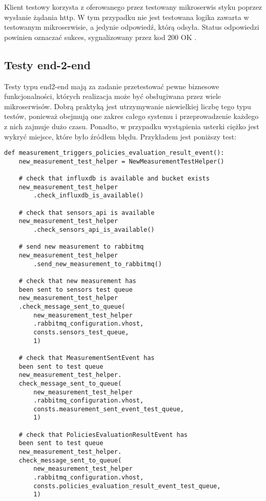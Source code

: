 Klient testowy korzysta z oferowanego przez testowany mikroserwis styku poprzez 
wysłanie żądania http. W tym przypadku nie jest testowana logika zawarta w testowanym 
mikroserwisie, a jedynie odpowiedź, którą odsyła. Status odpowiedzi powinien oznaczać 
sukces, sygnalizowany przez kod 200 OK \cite{fielding1999}.

\subsection{Testy end-2-end}

Testy typu end2-end mają za zadanie przetestować pewne biznesowe 
funkcjonalności, których realizacja może być obsługiwana przez wiele mikroserwisów. 
Dobrą praktyką jest utrzymywanie niewielkiej liczbę tego typu testów, ponieważ 
obejmują one zakres całego systemu i przeprowadzenie każdego z nich zajmuje dużo 
czasu. Ponadto, w przypadku wystąpienia usterki ciężko jest wykryć miejsce, które 
było źródłem błędu.
Przykładem jest poniższy test:

\begin{lstlisting}
def measurement_triggers_policies_evaluation_result_event():
    new_measurement_test_helper = NewMeasurementTestHelper()

    # check that influxdb is available and bucket exists
    new_measurement_test_helper
        .check_influxdb_is_available()

    # check that sensors_api is available
    new_measurement_test_helper
        .check_sensors_api_is_available()

    # send new measurement to rabbitmq
    new_measurement_test_helper
        .send_new_measurement_to_rabbitmq()

    # check that new measurement has 
    been sent to sensors test queue
    new_measurement_test_helper
    .check_message_sent_to_queue(
        new_measurement_test_helper
        .rabbitmq_configuration.vhost,
        consts.sensors_test_queue, 
        1)

    # check that MeasurementSentEvent has 
    been sent to test queue  
    new_measurement_test_helper.
    check_message_sent_to_queue(
        new_measurement_test_helper
        .rabbitmq_configuration.vhost,
        consts.measurement_sent_event_test_queue, 
        1)

    # check that PoliciesEvaluationResultEvent has 
    been sent to test queue
    new_measurement_test_helper.
    check_message_sent_to_queue(
        new_measurement_test_helper
        .rabbitmq_configuration.vhost,
        consts.policies_evaluation_result_event_test_queue, 
        1)


\end{lstlisting}

